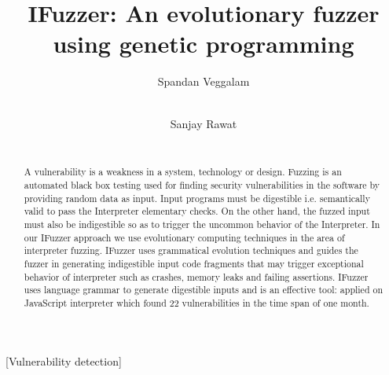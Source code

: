 \documentclass{acm_proc_article-sp}
\begin{document}

\title{IFuzzer: An evolutionary fuzzer using genetic programming}
\author{
\alignauthor
Spandan Veggalam\\
       \\
\and
\alignauthor
Sanjay Rawat\\
       \\
}
\maketitle

\begin{abstract}
A vulnerability is a weakness in a system, technology or design. Fuzzing is an automated black box testing used for finding security vulnerabilities in the software by providing random data as input. Input programs must be digestible i.e. semantically valid to pass the Interpreter elementary checks. On the other hand, the fuzzed input must also be indigestible so as to trigger the uncommon behavior of the Interpreter. In our IFuzzer approach we use evolutionary computing techniques in the area of interpreter fuzzing. IFuzzer uses grammatical evolution techniques and guides the fuzzer in generating indigestible input code fragments that may trigger exceptional behavior of interpreter such as crashes, memory leaks and failing assertions. IFuzzer uses language grammar to generate digestible inputs and is an effective tool: applied on JavaScript interpreter which found 22 vulnerabilities in the time span of one month.
\end{abstract}

[Vulnerability detection]
\end{document}
